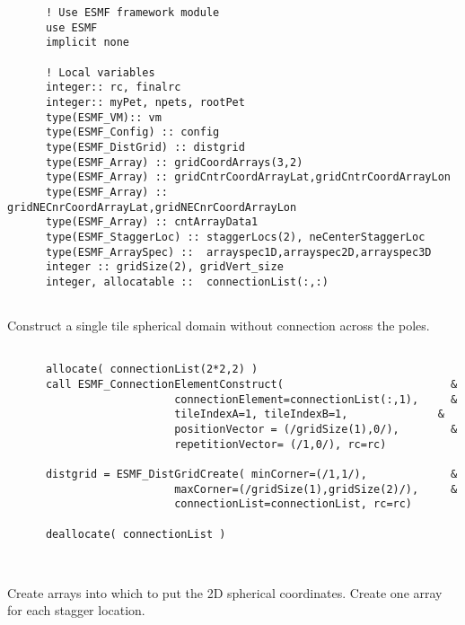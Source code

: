  \begin{verbatim}
      ! Use ESMF framework module
      use ESMF
      implicit none

      ! Local variables  
      integer:: rc, finalrc
      integer:: myPet, npets, rootPet
      type(ESMF_VM):: vm
      type(ESMF_Config) :: config
      type(ESMF_DistGrid) :: distgrid
      type(ESMF_Array) :: gridCoordArrays(3,2)
      type(ESMF_Array) :: gridCntrCoordArrayLat,gridCntrCoordArrayLon
      type(ESMF_Array) :: gridNECnrCoordArrayLat,gridNECnrCoordArrayLon
      type(ESMF_Array) :: cntArrayData1
      type(ESMF_StaggerLoc) :: staggerLocs(2), neCenterStaggerLoc
      type(ESMF_ArraySpec) ::  arrayspec1D,arrayspec2D,arrayspec3D
      integer :: gridSize(2), gridVert_size
      integer, allocatable ::  connectionList(:,:)
 
\end{verbatim}
 

   Construct a single tile spherical domain without connection across
   the poles. 

 \begin{verbatim}

      allocate( connectionList(2*2,2) )
      call ESMF_ConnectionElementConstruct(                          &
                          connectionElement=connectionList(:,1),     &
                          tileIndexA=1, tileIndexB=1,              &
                          positionVector = (/gridSize(1),0/),        &
                          repetitionVector= (/1,0/), rc=rc)

      distgrid = ESMF_DistGridCreate( minCorner=(/1,1/),             &
                          maxCorner=(/gridSize(1),gridSize(2)/),     &
                          connectionList=connectionList, rc=rc)  

      deallocate( connectionList )

 
\end{verbatim}
 

    Create arrays into which to put the 2D spherical coordinates. Create one array for each stagger location.  

